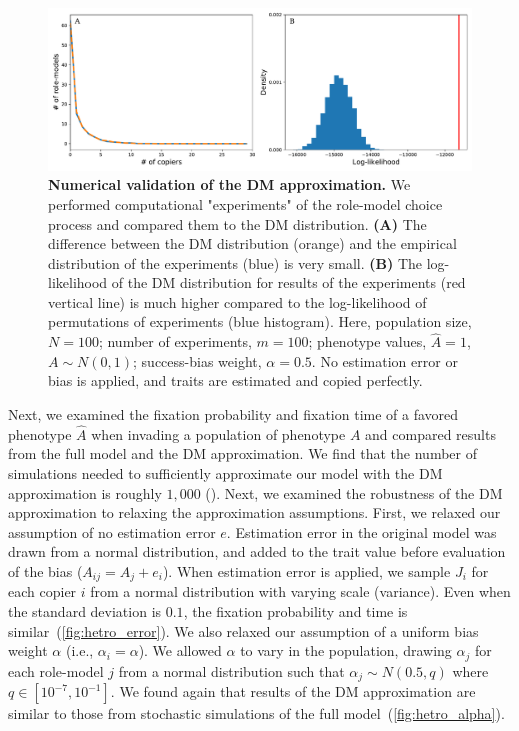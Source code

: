 \documentclass[12pt]{extarticle}
\begin{document}
\begin{figure}[h]
    \includegraphics[width=\linewidth]{../figures/final/DM_validation.pdf}
  \caption{
  \textbf{Numerical validation of the DM approximation.}
  We performed computational "experiments" of the role-model choice process and compared them to the DM distribution. 
  \textbf{(A)} The difference between the DM distribution (orange) and the empirical distribution of the experiments (blue) is very small. 
  \textbf{(B)} The log-likelihood of the DM distribution for results of the experiments (red vertical line) is much higher compared to the log-likelihood of permutations of experiments (blue histogram).
  Here, population size, $N=100$; number of experiments, $m=100$; phenotype values, $\hat{A}=1$, $A \sim N(0,1)$; success-bias weight, $\alpha=0.5$.
  No estimation error or bias is applied, and traits are estimated and copied perfectly.}	
  \label{fig:DM_validation}
\end{figure}


Next, we examined the fixation probability and fixation time of a favored phenotype $\hat{A}$ when invading a population of phenotype $A$ and compared results from the full model and the DM approximation.
We find that the number of simulations needed to sufficiently approximate our model with the DM approximation is roughly $1,000$ ().
Next, we examined the robustness of the DM approximation to relaxing the approximation assumptions.
First, we relaxed our assumption of no estimation error $e$.
Estimation error in the original model was drawn from a normal distribution, and added to the trait value before evaluation of the bias ($A_{ij} = A_j + e_i$).
When estimation error is applied, we sample $J_i$ for each copier $i$ from a normal distribution with varying scale (variance).
Even when the standard deviation is $0.1$, the fixation probability and time is similar~(\cref{fig:hetro_error}). 
We also relaxed our assumption of a uniform bias weight $\alpha$ (i.e., $\alpha_i=\alpha$). We allowed $\alpha$ to vary in the population, drawing $\alpha_j$ for each role-model $j$ from a normal distribution such that $\alpha_j \sim N(0.5,q)$ where $q \in [10^{-7},10^{-1}]$. 
We found again that results of the DM approximation are similar to those from stochastic simulations of the full model~(\cref{fig:hetro_alpha}).
\end{document}
